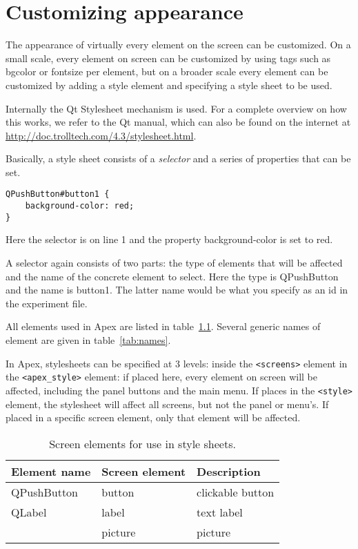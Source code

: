 \chapter{Customizing appearance}
\label{sec:Customizing appearance}

The appearance of virtually every element on the screen can be
customized. On a small scale, every element on screen can be
customized by using tags such as bgcolor or fontsize per element,
but on a broader scale every element can be customized by adding a
style element and specifying a style sheet to be used.

Internally the Qt Stylesheet mechanism is used. For a complete overview on how this works, we refer to the Qt manual, which can also be found on the internet at \url{http://doc.trolltech.com/4.3/stylesheet.html}.

Basically, a style sheet consists of a \emph{selector} and a series of properties that can be set.

\begin{lstlisting}
QPushButton#button1 {
    background-color: red;
}
\end{lstlisting}


Here the selector is on line  1 and the property background-color is set to red.

A selector again consists of two parts: the type of elements that will be affected and the name of the concrete element to select. Here the type is QPushButton and the name is button1. The latter name would be what you specify as an id in the experiment file.

All elements used in Apex are listed in table~\ref{tab:elements}. Several generic names of element are given in table~\ref{tab:names}.

In Apex, stylesheets can be specified at 3 levels: inside the \lstinline!<screens>! element in the \lstinline!<apex_style>! element: if placed here, every element on screen will be affected, including the panel buttons and the main menu. If places in the \lstinline!<style>! element, the stylesheet will affect all screens, but not the panel or menu's. If placed in a specific screen element, only that element will be affected.

\begin{table}
\begin{center}
\begin{tabular}{lll}        \toprule
Element name & Screen element & Description \\      \midrule
QPushButton & button & clickable button \\
QLabel & label & text label \\
& picture & picture  \\
\bottomrule
\end{tabular}
\end{center}
\caption{Screen elements for use in style sheets.}
\label{tab:elements}
\end{table}


